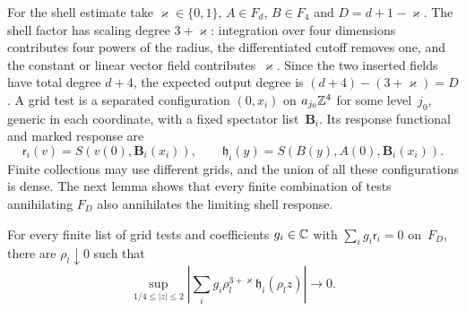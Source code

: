 For the shell estimate take $\varkappa\in\{0,1\}$, $A\in F_d$, $B\in F_4$ and $D=d+1-\varkappa$. The shell factor has scaling degree $3+\varkappa$: integration over four dimensions contributes four powers of the radius, the differentiated cutoff removes one, and the constant or linear vector field contributes~$\varkappa$. Since the two inserted fields have total degree $d+4$, the expected output degree is $(d+4)-(3+\varkappa)=D$. A grid test is a separated configuration $(0,x_i)$ on $a_{j_0}\mathbb{Z}^4$ for some level~$j_0$, generic in each coordinate, with a fixed spectator list~$\boldsymbol B_i$. Its response functional and marked response are
\begin{equation*}
\mathsf r_i(v)=S(v(0),\boldsymbol B_i(x_i)),\qquad
\mathfrak h_i(y)=S(B(y),A(0),\boldsymbol B_i(x_i)).
\end{equation*}
Finite collections may use different grids, and the union of all these configurations is dense. The next lemma shows that every finite combination of tests annihilating $F_D$ also annihilates the limiting shell response.
\begin{lemma}\label{lem:G-annular}
For every finite list of grid tests and coefficients $g_i\in\mathbb{C}$ with $\sum_i g_i\mathsf r_i=0$ on~$F_D$, there are $\rho_l\downarrow0$ such that
\begin{equation}\label{eq:G-annular-input}
\sup_{1/4\le|z|\le2}\left|\sum_i g_i\rho_l^{3+\varkappa}\mathfrak h_i(\rho_lz)\right|\longrightarrow0.
\end{equation}
\end{lemma}

